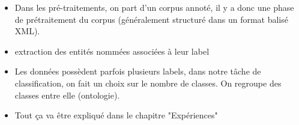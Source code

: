 \begin{itemize}

\item Dans les pré-traitements, on part d'un corpus annoté, il y a donc une phase de prétraitement du corpus (généralement structuré dans un format balisé XML).  
\item extraction des entités nommées associées à leur label
\item Les données possèdent parfois plusieurs labels, dans notre tâche de classification, on fait un choix sur le nombre de classes. On regroupe des classes entre elle (ontologie). 
\item Tout ça va être expliqué dans le chapitre "Expériences"

\end{itemize}
